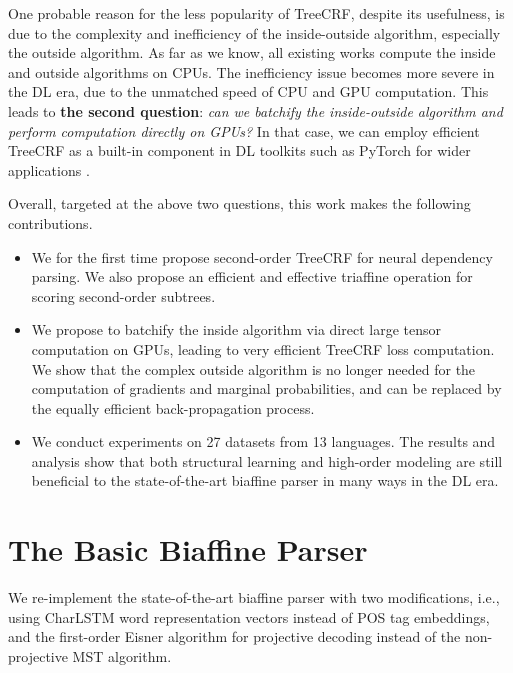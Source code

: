 \documentclass[11pt,a4paper]{article}
\begin{document}
One probable reason for the less popularity of TreeCRF, despite its usefulness, is
due to the complexity and inefficiency of the inside-outside algorithm, especially the outside algorithm.
As far as we know, all existing works compute the inside and outside algorithms on CPUs.
The inefficiency issue becomes more severe in the DL era, due to the unmatched speed of CPU and GPU computation.
This leads to \textbf{the second question}:
\emph{can we batchify the inside-outside algorithm and perform computation directly on GPUs?}
In that case, we can employ efficient TreeCRF as a built-in component in DL toolkits such as PyTorch
for wider applications \cite{cai-etal-2017-crf,le-zuidema-2014-inside}.
















Overall, targeted at the above two questions, this work makes the following contributions.
\begin{itemize}\item We for the first time propose second-order TreeCRF for neural dependency parsing.
We also propose an efficient and effective triaffine operation for scoring second-order subtrees.
\item We propose to batchify the inside algorithm via direct large tensor computation on GPUs,
leading to very efficient TreeCRF loss computation.
We show that the complex outside algorithm is no longer needed for the computation of gradients and marginal probabilities,
and can be replaced by the equally efficient back-propagation process.
\item We conduct experiments on 27 datasets from 13 languages. The results and analysis show that
both structural learning and high-order modeling are still beneficial to the state-of-the-art biaffine parser in many ways in the DL era.
\end{itemize}


%
 
\section{The Basic Biaffine Parser}
\label{section:basic_model}


We re-implement the state-of-the-art biaffine parser \cite{Timothy-d17-biaffine} with
two modifications, i.e., using CharLSTM word representation vectors instead of POS tag embeddings, and
the first-order Eisner algorithm \cite{eisner-2000-iwptbook}
for projective decoding instead of the non-projective MST algorithm.
\end{document}
